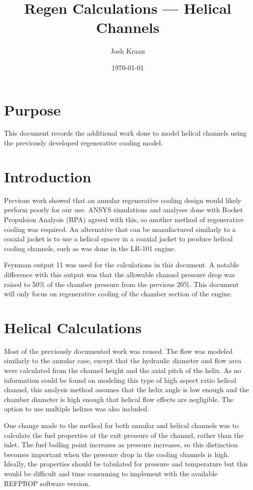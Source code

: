 \documentclass[11pt]{article}
\title{Regen Calculations --- Helical Channels}
\author{Josh Kraan}
\date{\today}
\begin{document}
\maketitle

\section{Purpose}

This document records the additional work done to model helical channels using the previously developed regenerative cooling model.

\section{Introduction}

Previous work showed that an annular regenerative cooling design would likely perform poorly for our use. ANSYS simulations and analyses done with Rocket Propulsion Analysis (RPA) agreed with this, so another method of regenerative cooling was required. An alternative that can be manufactured similarly to a coaxial jacket is to use a helical spacer in a coaxial jacket to produce helical cooling channels, such as was done in the LR-101 engine.

Feynman output 11 was used for the calculations in this document. A notable difference with this output was that the allowable channel pressure drop was raised to 50\% of the chamber pressure from the previous 20\%. This document will only focus on regenerative cooling of the chamber section of the engine.

\section{Helical Calculations}

Most of the previously documented work was reused. The flow was modeled similarly to the annular case, except that the hydraulic diameter and flow area were calculated from the channel height and the axial pitch of the helix. As no information could be found on modeling this type of high aspect ratio helical channel, this analysis method assumes that the helix angle is low enough and the chamber diameter is high enough that helical flow effects are negligible. The option to use multiple helixes was also included.

One change made to the method for both annular and helical channels was to calculate the fuel properties at the exit pressure of the channel, rather than the inlet. The fuel boiling point increases as pressure increases, so this distinction becomes important when the pressure drop in the cooling channels is high. Ideally, the properties should be tabulated for pressure and temperature but this would be difficult and time consuming to implement with the available REFPROP software version.
\end{document}
